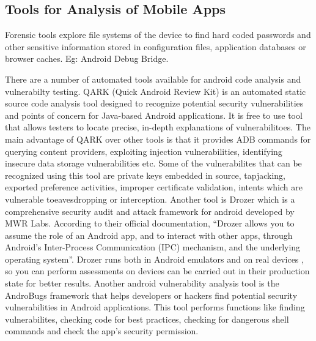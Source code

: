 \documentclass{mproj}
\begin{document}
\subsection{Tools for Analysis of Mobile Apps}

Forensic tools explore file systems of the device to find hard coded passwords and other sensitive information stored in configuration files, application databases or browser caches. Eg: Android Debug Bridge.

There are a number of automated tools available for android code analysis and vulnerabilty testing. QARK (Quick Android Review Kit) is an automated static source code analysis tool designed to recognize potential security vulnerabilities and points of concern for Java-based Android applications\cite{qark}. It is free to use tool that allows testers to locate precise, in-depth explanations of vulnerabilitoes.  The main advantage of QARK over other tools is that it provides  ADB commands for querying content providers, exploiting injection vulnerabilities, identifying insecure data storage vulnerabilities etc. Some of the vulnerabilites that can be recognized using this tool are private keys embedded in source, tapjacking, exported preference activities, improper certificate validation, intents which are vulnerable toeavesdropping or interception. Another tool is Drozer which is a comprehensive security audit and attack framework for android developed by MWR Labs. According to their official documentation, “Drozer allows you to assume the role of an Android app, and to interact with other apps, through Android’s Inter-Process Communication (IPC) mechanism, and the underlying operating system”\cite{drozer}. Drozer runs both in Android emulators and on real devices , so you can perform assessments on devices can be carried out in their production state for better results. Another android vulnerability analysis tool is the AndroBugs framework that helps developers or hackers find potential security vulnerabilities in Android applications. This tool performs functions like finding vulnerabilites, checking code for best practices, checking for dangerous shell commands and check the app's security permission\cite{androbugs}.
\end{document}

